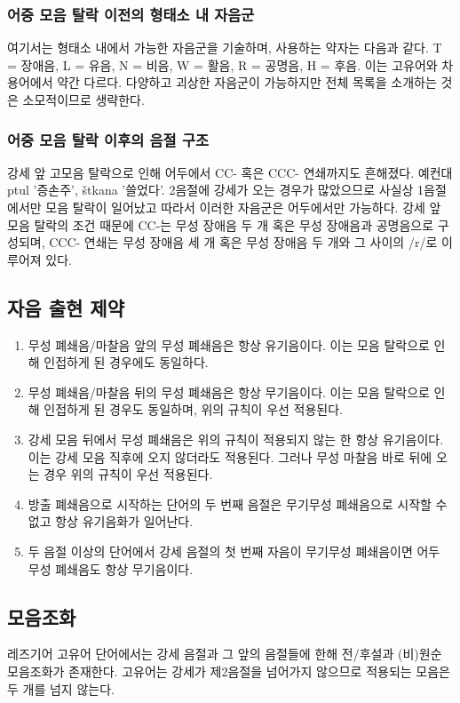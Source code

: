 \subsubsection{어중 모음 탈락 이전의 형태소 내 자음군}
여기서는 형태소 내에서 가능한 자음군을 기술하며, 사용하는 약자는 다음과 같다. T = 장애음, L = 유음, N = 비음, W = 활음, R = 공명음, H = 후음. 이는 고유어와 차용어에서 약간 다르다.
다양하고 괴상한 자음군이 가능하지만 전체 목록을 소개하는 것은 소모적이므로 생략한다.
\subsubsection{어중 모음 탈락 이후의 음절 구조}
강세 앞 고모음 탈락으로 인해 어두에서 CC- 혹은 CCC- 연쇄까지도 흔해졌다. 예컨대 ptul '증손주', štkana '쓸었다'. 2음절에 강세가 오는 경우가 많았으므로 사실상 1음절에서만 모음 탈락이 일어났고 따라서 이러한 자음군은 어두에서만 가능하다. 강세 앞 모음 탈락의 조건 때문에 CC-는 무성 장애음 두 개 혹은 무성 장애음과 공명음으로 구성되며, CCC- 연쇄는 무성 장애음 세 개 혹은 무성 장애음 두 개와 그 사이의 /r/로 이루어져 있다. 
\subsection{자음 출현 제약}
\begin{enumerate}
	\item 무성 폐쇄음/마찰음 앞의 무성 폐쇄음은 항상 유기음이다. 이는 모음 탈락으로 인해 인접하게 된 경우에도 동일하다.
	\item 무성 폐쇄음/마찰음 뒤의 무성 폐쇄음은 항상 무기음이다. 이는 모음 탈락으로 인해 인접하게 된 경우도 동일하며, 위의 규칙이 우선 적용된다.
	\item 강세 모음 뒤에서 무성 폐쇄음은 위의 규칙이 적용되지 않는 한 항상 유기음이다. 이는 강세 모음 직후에 오지 않더라도 적용된다. 그러나 무성 마찰음 바로 뒤에 오는 경우 위의 규칙이 우선 적용된다.
	\item 방출 폐쇄음으로 시작하는 단어의 두 번째 음절은 무기무성 폐쇄음으로 시작할 수 없고 항상 유기음화가 일어난다.
	\item 두 음절 이상의 단어에서 강세 음절의 첫 번째 자음이 무기무성 폐쇄음이면 어두 무성 폐쇄음도 항상 무기음이다.
\end{enumerate}
\subsection{모음조화}
레즈기어 고유어 단어에서는 강세 음절과 그 앞의 음절들에 한해 전/후설과 (비)원순 모음조화가 존재한다. 고유어는 강세가 제2음절을 넘어가지 않으므로 적용되는 모음은 두 개를 넘지 않는다.

